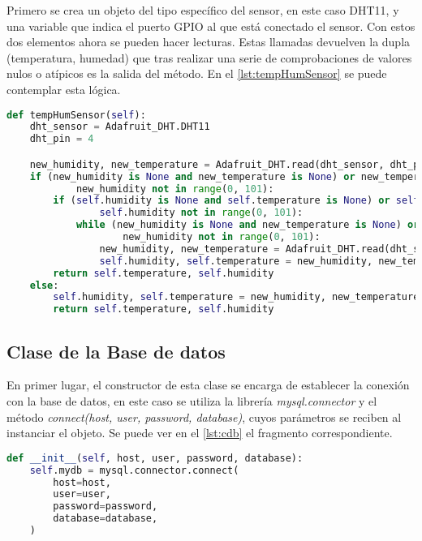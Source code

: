 Primero se crea un objeto del tipo específico del sensor, en este caso DHT11, y una variable que indica el puerto GPIO al que está conectado el sensor. Con estos dos elementos ahora se pueden hacer lecturas. Estas llamadas devuelven la dupla (temperatura, humedad) que tras realizar una serie de comprobaciones de valores nulos o atípicos es la salida del método. En el \autoref{lst:tempHumSensor} se puede contemplar esta lógica.
\begin{lstlisting}[language=Python, label=lst:tempHumSensor, caption=Lectura de la temperatura y humedad]
def tempHumSensor(self):
    dht_sensor = Adafruit_DHT.DHT11
    dht_pin = 4

    new_humidity, new_temperature = Adafruit_DHT.read(dht_sensor, dht_pin)
    if (new_humidity is None and new_temperature is None) or new_temperature not in range(0, 101) or \
            new_humidity not in range(0, 101):
        if (self.humidity is None and self.temperature is None) or self.temperature not in range(0, 101) or \
                self.humidity not in range(0, 101):
            while (new_humidity is None and new_temperature is None) or new_temperature not in range(0, 101) or \
                    new_humidity not in range(0, 101):
                new_humidity, new_temperature = Adafruit_DHT.read(dht_sensor, dht_pin)
                self.humidity, self.temperature = new_humidity, new_temperature
        return self.temperature, self.humidity
    else:
        self.humidity, self.temperature = new_humidity, new_temperature
        return self.temperature, self.humidity
\end{lstlisting}

\subsection{Clase de la Base de datos}\label{subsec:clase-de-la-base-de-datos}
En primer lugar, el constructor de esta clase se encarga de establecer la conexión con la base de datos, en este caso se utiliza la librería \textit{mysql.connector} y el método \textit{connect(host, user, password, database)}, cuyos parámetros se reciben al instanciar el objeto. Se puede ver en el \autoref{lst:cdb} el fragmento correspondiente.
\begin{lstlisting}[language=Python, label=lst:cdb, caption=Conexión con la base de datos]
def __init__(self, host, user, password, database):
    self.mydb = mysql.connector.connect(
        host=host,
        user=user,
        password=password,
        database=database,
    )
\end{lstlisting}

